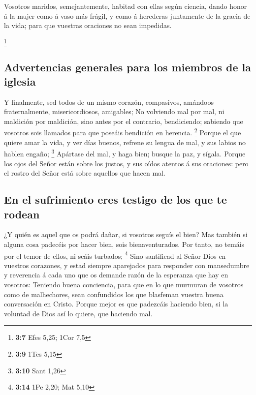  Vosotros maridos, semejantemente, habitad con ellas según
ciencia, dando honor á la mujer como á vaso más frágil, y como á
herederas juntamente de la gracia de la vida; para que vuestras
oraciones no sean impedidas.

\footnote{\textbf{3:7} Efes 5,25; 1Cor 7,5}

\hypertarget{advertencias-generales-para-los-miembros-de-la-iglesia}{%
\subsection{Advertencias generales para los miembros de la
iglesia}\label{advertencias-generales-para-los-miembros-de-la-iglesia}}

 Y finalmente, sed todos de un mismo corazón, compasivos,
amándoos fraternalmente, misericordiosos, amigables;  No
volviendo mal por mal, ni maldición por maldición, sino antes por el
contrario, bendiciendo; sabiendo que vosotros sois llamados para que
poseáis bendición en herencia. \footnote{\textbf{3:9} 1Tes 5,15}
 Porque el que quiere amar la vida, y ver días buenos,
refrene su lengua de mal, y sus labios no hablen engaño; \footnote{\textbf{3:10}
  Sant 1,26}  Apártase del mal, y haga bien; busque la
paz, y sígala.  Porque los ojos del Señor están sobre los
justos, y sus oídos atentos á sus oraciones: pero el rostro del Señor
está sobre aquellos que hacen mal.

\hypertarget{en-el-sufrimiento-eres-testigo-de-los-que-te-rodean}{%
\subsection{En el sufrimiento eres testigo de los que te
rodean}\label{en-el-sufrimiento-eres-testigo-de-los-que-te-rodean}}

 ¿Y quién es aquel que os podrá dañar, si vosotros seguís
el bien?  Mas también si alguna cosa padecéis por hacer
bien, sois bienaventurados. Por tanto, no temáis por el temor de ellos,
ni seáis turbados; \footnote{\textbf{3:14} 1Pe 2,20; Mat 5,10}
 Sino santificad al Señor Dios en vuestros corazones, y
estad siempre aparejados para responder con mansedumbre y reverencia á
cada uno que os demande razón de la esperanza que hay en vosotros:
 Teniendo buena conciencia, para que en lo que murmuran
de vosotros como de malhechores, sean confundidos los que blasfeman
vuestra buena conversación en Cristo.  Porque mejor es
que padezcáis haciendo bien, si la voluntad de Dios así lo quiere, que
haciendo mal.

